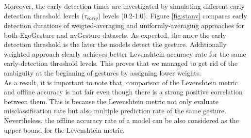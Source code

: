 Moreover, the early detection times are investigated by simulating different early detection threshold levels ($\tau_{early}$) levels (0.2-1.0). Figure \ref{fig:stanv} compares early detection durations of weigted-averaging and uniformly-averaging approaches for both EgoGesture and nvGesture datasets. As expected, the more the early detection threshold is the later the models detect the gesture. Additionally weighted approach clearly achieves better Levenshtein accuracy rate for the same early-detection threshold levels. This proves that we managed to get rid of the ambiguity at the beginning of gestures by assigning lower weights.\\ 

As a result, it is important to note that, comparison of the Levenshtein metric and offline accuracy is not fair even though there is a strong positive correlation between them. This is because the Levenshtein metric not only evaluate misclassification rate but also multiple prediction rate of the same gesture. Nevertheless, the offline accuracy rate of a model can be also considered as the upper bound for the Levenshtein metric.\\